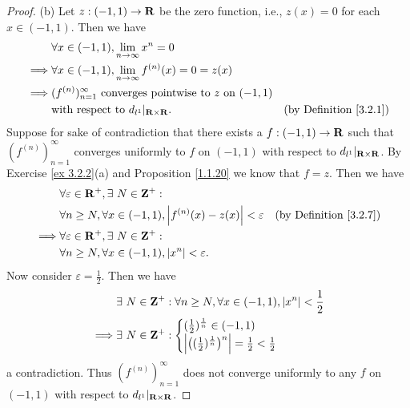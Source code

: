 \begin{proof}{(b)}
    Let \(z : (-1, 1) \to \mathbf{R}\) be the zero function, i.e., \(z(x) = 0\) for each \(x \in (-1, 1)\).
    Then we have
    \begin{align*}
                 & \forall x \in (-1, 1), \lim_{n \to \infty} x^n = 0                                                                  \\
        \implies & \forall x \in (-1, 1), \lim_{n \to \infty} f^{(n)}(x) = 0 = z(x)                                                    \\
        \implies & (f^{(n)})_{n = 1}^\infty \text{ converges pointwise to } z \text{ on } (-1, 1)                                      \\
                 & \text{with respect to } d_{l^1}|_{\mathbf{R} \times \mathbf{R}}.                               & \text{(by Definition \ref{3.2.1})}
    \end{align*}
    Suppose for sake of contradiction that there exists a \(f : (-1, 1) \to \mathbf{R}\) such that \((f^{(n)})_{n = 1}^\infty\) converges uniformly to \(f\) on \((-1, 1)\) with respect to \(d_{l^1}|_{\mathbf{R} \times \mathbf{R}}\).
    By Exercise \ref{ex 3.2.2}(a) and Proposition \ref{1.1.20} we know that \(f = z\).
    Then we have
    \begin{align*}
                 & \forall \varepsilon \in \mathbf{R}^+, \exists\ N \in \mathbf{Z}^+ :                                                                 \\
                 & \forall n \geq N, \forall x \in (-1, 1), \left\lvert f^{(n)}(x) - z(x)\right\rvert < \varepsilon & \text{(by Definition \ref{3.2.7})} \\
        \implies & \forall \varepsilon \in \mathbf{R}^+, \exists\ N \in \mathbf{Z}^+ :                                                                 \\
                 & \forall n \geq N, \forall x \in (-1, 1), \left\lvert x^n\right\rvert < \varepsilon.
    \end{align*}
    Now consider \(\varepsilon = \frac{1}{2}\).
    Then we have
    \begin{align*}
                 & \exists\ N \in \mathbf{Z}^+ : \forall n \geq N, \forall x \in (-1, 1), \left\lvert x^n\right\rvert < \frac{1}{2}                                              \\
        \implies & \exists\ N \in \mathbf{Z}^+ : \begin{cases}
                                             (\frac{1}{2})^{\frac{1}{n}} \in (-1, 1) \\
                                             \left\lvert\big((\frac{1}{2})^{\frac{1}{n}}\big)^n\right\rvert = \frac{1}{2} < \frac{1}{2}
                                         \end{cases}
    \end{align*}
    a contradiction.
    Thus \((f^{(n)})_{n = 1}^\infty\) does not converge uniformly to any \(f\) on \((-1, 1)\) with respect to \(d_{l^1}|_{\mathbf{R} \times \mathbf{R}}\).
\end{proof}

